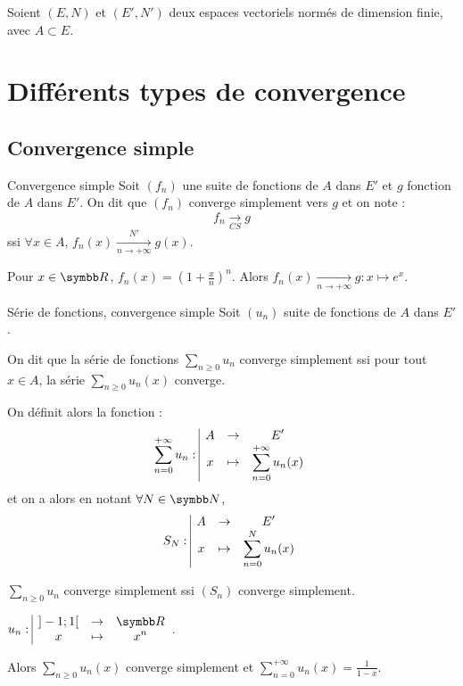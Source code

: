 Soient $(E, N)$ et $(E', N')$ deux espaces vectoriels normés de dimension finie, avec 
$A \subset E$.

\section{Différents types de convergence}
\subsection{Convergence simple}

\begin{definition}{Convergence simple}{}
    Soit $(f_n)$ une suite de fonctions de $A$ dans $E'$ et $g$ fonction de $A$ dans $E'$. 
    On dit que $(f_n)$ converge simplement vers $g$ et on note :
    \[f_n \xrightarrow[CS]{} g\]
    ssi $\forall x \in A, \, f_n(x) \xrightarrow[n\to +\infty]{N'} g(x)$.
\end{definition}

\begin{exemple}
    Pour $x \in \R$, $f_n(x) = \left( 1 + \frac x n \right)^n$.
    Alors $f_n(x) \xrightarrow[n\to +\infty]{} g : x \mapsto e^x$.
\end{exemple}

\begin{definition}{Série de fonctions, convergence simple}{}
    Soit $(u_n)$ suite de fonctions de $A$ dans $E'$.

    On dit que la série de fonctions $\displaystyle \sum_{n \geqslant 0} u_n$ converge simplement 
    ssi pour tout $x \in A$, la série $\displaystyle \sum_{n \geqslant 0} u_n(x)$ converge.

    On définit alors la fonction :
    \[
        \sum_{n = 0 }^{ + \infty } u_n : \space \begin{array}{|ccc} \displaystyle A & \to & \displaystyle E' \\ \displaystyle x & \mapsto & \displaystyle \sum_{n = 0}^{ + \infty } u_n(x) \end{array}
    \]
    et on a alors en notant $\forall N \in \N$, \[S_N: \space \begin{array}{|ccc} \displaystyle A & \to & \displaystyle E' \\ \displaystyle x & \mapsto & \displaystyle \sum_{n = 0}^N u_n(x) \end{array}\]

    $\displaystyle \sum_{n \geqslant 0} u_n$ converge simplement ssi $(S_n)$ converge simplement.

\end{definition}

\begin{exemple}
    $\displaystyle \fonction{u_n}{]-1; 1[}{\R}{x}{x^n}$.

    Alors $\displaystyle \sum_{n \geqslant 0} u_n(x)$ converge simplement et $\displaystyle \sum_{n = 0}^{ + \infty } u_n(x) = \frac{1}{1-x}$.
\end{exemple}


